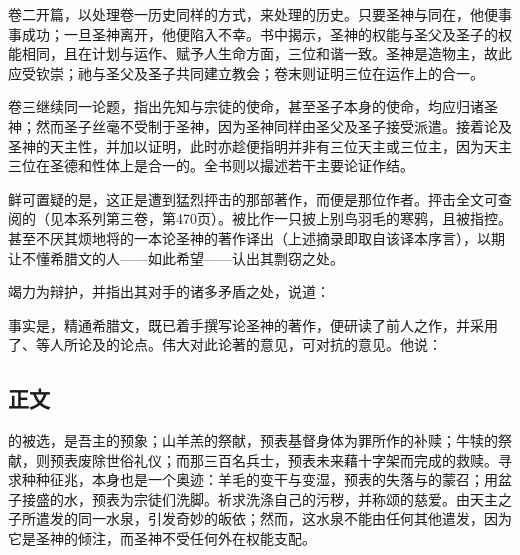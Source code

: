 卷二开篇，以处理卷一历史同样的方式，来处理的历史。只要圣神与同在，他便事事成功；一旦圣神离开，他便陷入不幸。书中揭示，圣神的权能与圣父及圣子的权能相同，且在计划与运作、赋予人生命方面，三位和谐一致。圣神是造物主，故此应受钦崇；祂与圣父及圣子共同建立教会；卷末则证明三位在运作上的合一。\par

卷三继续同一论题，指出先知与宗徒的使命，甚至圣子本身的使命，均应归诸圣神；然而圣子丝毫不受制于圣神，因为圣神同样由圣父及圣子接受派遣。接着论及圣神的天主性，并加以证明，此时亦趁便指明并非有三位天主或三位主，因为天主三位在圣德和性体上是合一的。全书则以撮述若干主要论证作结。\par

鲜可置疑的是，这正是遭到猛烈抨击的那部著作，而便是那位作者。抨击全文可查阅的（见本系列第三卷，第470页）。被比作一只披上别鸟羽毛的寒鸦，且被指控。甚至不厌其烦地将的一本论圣神的著作译出（上述摘录即取自该译本序言），以期让不懂希腊文的人——如此希望——认出其剽窃之处。\par

竭力为辩护，并指出其对手的诸多矛盾之处，说道：\par

事实是，精通希腊文，既已着手撰写论圣神的著作，便研读了前人之作，并采用了、等人所论及的论点。伟大对此论著的意见，可对抗的意见。他说：\par


\subsection{正文}

\par

的被选，是吾主的预象；山羊羔的祭献，预表基督身体为罪所作的补赎；牛犊的祭献，则预表废除世俗礼仪；而那三百名兵士，预表未来藉十字架而完成的救赎。寻求种种征兆，本身也是一个奥迹：羊毛的变干与变湿，预表的失落与的蒙召；用盆子接盛的水，预表为宗徒们洗脚。祈求洗涤自己的污秽，并称颂的慈爱。由天主之子所遣发的同一水泉，引发奇妙的皈依；然而，这水泉不能由任何其他遣发，因为它是圣神的倾注，而圣神不受任何外在权能支配。\par

